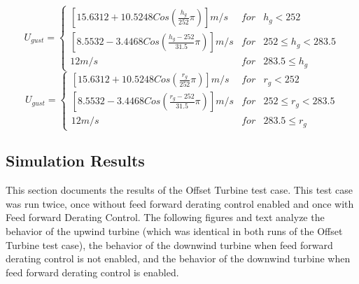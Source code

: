 \begin{equation} 
	U_{gust}=\left\{\begin{matrix}
\left [15.6312 +10.5248Cos\left ( \frac{h_g}{252 }\pi  \right )  \right ]m/s & for  & h_g<252\\ 
 \left [8.5532 -3.4468Cos\left ( \frac{h_g-252}{31.5}\pi  \right )  \right ]m/s & for  & 252 \leq h_g <283.5\\ 
 12 m/s &  for & 283.5 \leq h_g
\end{matrix}\right. 
\label{eq6-2}
\end{equation}
\begin{equation} 
	U_{gust}=\left\{\begin{matrix}
\left [15.6312 +10.5248Cos\left ( \frac{r_g}{252 }\pi  \right )  \right ]m/s & for  & r_g<252\\ 
 \left [8.5532 -3.4468Cos\left ( \frac{r_g-252}{31.5}\pi  \right )  \right ]m/s & for  & 252 \leq r_g <283.5\\ 
 12 m/s &  for & 283.5 \leq r_g
\end{matrix}\right. 
\label{eq6-3}
\end{equation}

\subsection{Simulation Results} \label{section6-6-2}
This section documents the results of the Offset Turbine test case. This test case was run twice, once without feed forward derating control enabled and once with Feed forward Derating Control. The following figures and text analyze the behavior of the upwind turbine (which was identical in both runs of the Offset Turbine test case), the behavior of the downwind turbine when feed forward derating control is not enabled, and the behavior of the downwind turbine when feed forward derating control is enabled.

